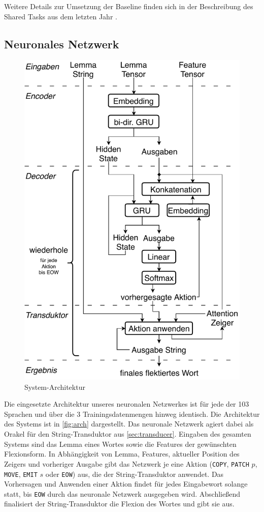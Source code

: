 \documentclass[11pt,a4paper]{article}
\newcommand{\action}[1]{\texttt{#1}}
\begin{document}
Weitere Details zur Umsetzung der Baseline finden sich in der Beschreibung des Shared Tasks aus dem letzten Jahr \citep{sigmorphon:st2017}.

\subsection{Neuronales Netzwerk}
\begin{figure}
\centering
\includegraphics[width=\linewidth]{architecture_de}
\caption{System-Architektur}
\label{fig:arch}
\end{figure}
Die eingesetzte Architektur unseres neuronalen Netzwerkes ist für jede der 103 Sprachen und über die 3 Trainingsdatenmengen hinweg identisch.
Die Architektur des Systems ist in \autoref{fig:arch} dargestellt. Das neuronale Netzwerk agiert dabei als Orakel für den String-Transduktor aus \autoref{sec:transducer}.
Eingaben des gesamten Systems sind das Lemma eines Wortes sowie die Features der gewünschten Flexionsform.
In Abhängigkeit von Lemma, Features, aktueller Position des Zeigers und vorheriger Ausgabe gibt das Netzwerk je eine Aktion (\action{COPY}, \action{PATCH} $p$, \action{MOVE}, \action{EMIT} $s$ oder \action{EOW}) aus, die der String-Transduktor anwendet.
Das Vorhersagen und Anwenden einer Aktion findet für jedes Eingabewort solange statt, bis \action{EOW} durch das neuronale Netzwerk ausgegeben wird. Abschließend finalisiert der String-Transduktor die Flexion des Wortes und gibt sie aus.
\end{document}

